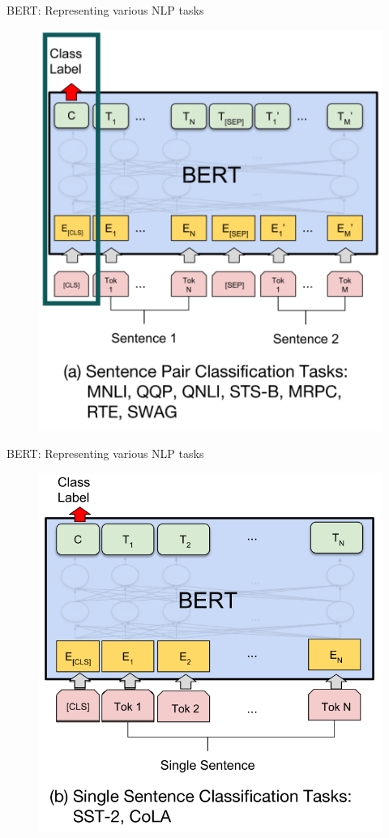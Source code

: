 \documentclass[12pt,aspectratio=169,handout]{beamer}
\begin{document}
\begin{frame}{BERT: Representing various NLP tasks}
	
	\begin{figure}
		\includegraphics[width=0.6\linewidth]{img/task1.png}
	\end{figure}


	
\end{frame}



\begin{frame}{BERT: Representing various NLP tasks}
	
	\begin{figure}
		\includegraphics[width=0.6\linewidth]{img/task2.png}
	\end{figure}
	
	
\end{frame}
\end{document}
